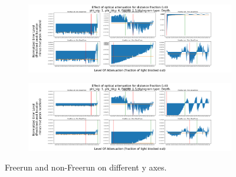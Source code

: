 \documentclass[aspectratio=169]{beamer}
\begin{document}
\begin{frame}
  \begin{figure}[H]
    \centering
    \begin{subfigure}[b]{0.75\textwidth}
      \includegraphics[width=1\linewidth]{zoomedFreeExample.png}
      \label{fig:zoomedExample}
    \end{subfigure}
    \begin{subfigure}[b]{0.75\textwidth}
      \includegraphics[width=1\linewidth]{sharedFreeExample.png}
      \label{fig:sharedExample}
    \end{subfigure}
    \caption{\label{fig:freerunComparsion}\color{Blue}Freerun and non-Freerun on different y axes.}
  \end{figure}
\end{frame}
\end{document}
